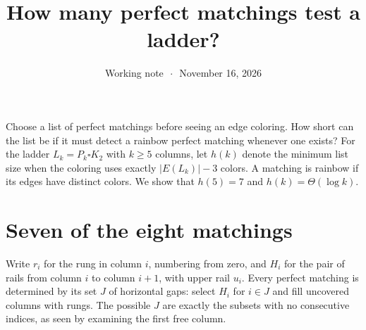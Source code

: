 \documentclass[11pt]{article}
\title{\LARGE\bfseries How many perfect matchings test a ladder?}
\author{}
\date{Working note \(\,\cdot\,\) November 16, 2026}
\begin{document}
\maketitle
\noindent Choose a list of perfect matchings before seeing an edge coloring.
How short can the list be if it must detect a rainbow perfect matching
whenever one exists? For the ladder \(L_k=P_k\square K_2\) with \(k\ge5\)
columns, let \(h(k)\) denote the minimum list size when the coloring uses
exactly \(|E(L_k)|-3\) colors. A matching is rainbow if its edges have distinct
colors. We show that \(h(5)=7\) and \(h(k)=\Theta(\log k)\).

\section{Seven of the eight matchings}
Write \(r_i\) for the rung in column \(i\), numbering from zero, and \(H_i\)
for the pair of rails from column \(i\) to column \(i+1\), with upper rail
\(u_i\). Every perfect matching is determined by its set \(J\) of horizontal
gaps: select \(H_i\) for \(i\in J\) and fill uncovered columns with rungs.
The possible \(J\) are exactly the subsets with no consecutive indices,
as seen by examining the first free column.
\end{document}
